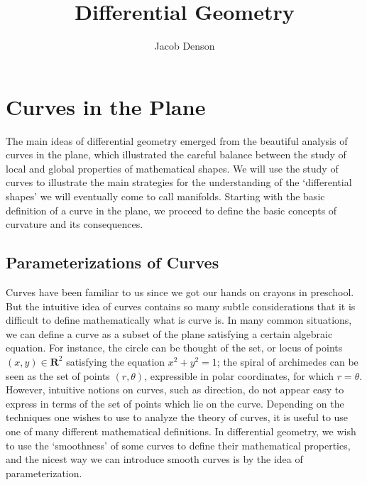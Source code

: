 

\title{Differential Geometry}
\author{Jacob Denson}



\maketitle
\tableofcontents
{}

\chapter{Curves in the Plane}

The main ideas of differential geometry emerged from the beautiful analysis of curves in the plane, which illustrated the careful balance between the study of local and global properties of mathematical shapes. We will use the study of curves to illustrate the main strategies for the understanding of the `differential shapes' we will eventually come to call manifolds. Starting with the basic definition of a curve in the plane, we proceed to define the basic concepts of curvature and its consequences.

\section{Parameterizations of Curves}

Curves have been familiar to us since we got our hands on crayons in preschool. But the intuitive idea of curves contains so many subtle considerations that it is difficult to define mathematically what is curve is. In many common situations, we can define a curve as a subset of the plane satisfying a certain algebraic equation. For instance, the circle can be thought of the set, or locus of points $(x,y) \in \mathbf{R}^2$ satisfying the equation $x^2 + y^2 = 1$; the spiral of archimedes can be seen as the set of points $(r,\theta)$, expressible in polar coordinates, for which $r = \theta$. However, intuitive notions on curves, such as direction, do not appear easy to express in terms of the set of points which lie on the curve. Depending on the techniques one wishes to use to analyze the theory of curves, it is useful to use one of many different mathematical definitions. In differential geometry, we wish to use the `smoothness' of some curves to define their mathematical properties, and the nicest way we can introduce smooth curves is by the idea of parameterization.

